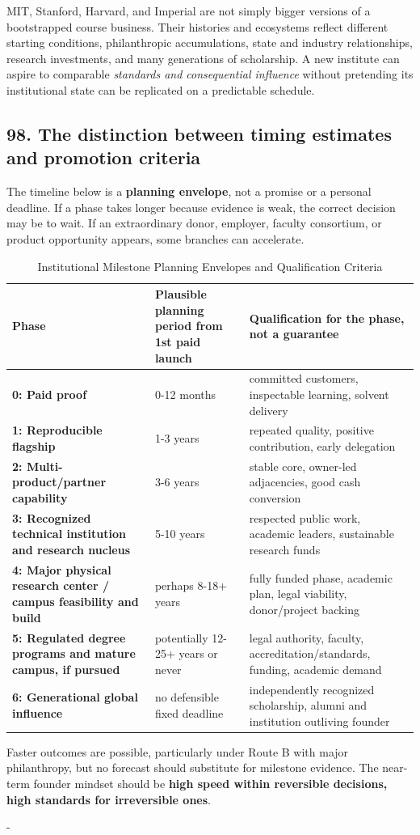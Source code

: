 MIT, Stanford, Harvard, and Imperial are not simply bigger versions of a bootstrapped course business. Their histories and ecosystems reflect different starting conditions, philanthropic accumulations, state and industry relationships, research investments, and many generations of scholarship. A new institute can aspire to comparable \textit{standards and consequential influence} without pretending its institutional state can be replicated on a predictable schedule.

\subsection{98. The distinction between timing estimates and promotion criteria}

The timeline below is a \textbf{planning envelope}, not a promise or a personal deadline. If a phase takes longer because evidence is weak, the correct decision may be to wait. If an extraordinary donor, employer, faculty consortium, or product opportunity appears, some branches can accelerate.

\begin{table}[t]
\centering
\small
\caption{Institutional Milestone Planning Envelopes and Qualification Criteria}
\label{tab:ch36_promotion_criteria}
\begin{tabularx}{\textwidth}{p{3.8cm} p{3.2cm} X}
\toprule
\textbf{ Phase } & \textbf{ Plausible planning period from 1st paid launch } & \textbf{ Qualification for the phase, not a guarantee } \\
\midrule
 \textbf{0: Paid proof}  &  0-12 months  &  committed customers, inspectable learning, solvent delivery  \\
 \textbf{1: Reproducible flagship}  &  1-3 years  &  repeated quality, positive contribution, early delegation  \\
 \textbf{2: Multi-product/\allowbreak partner capability}  &  3-6 years  &  stable core, owner-led adjacencies, good cash conversion  \\
 \textbf{3: Recognized technical institution and research nucleus}  &  5-10 years  &  respected public work, academic leaders, sustainable research funds  \\
 \textbf{4: Major physical research center / campus feasibility and build}  &  perhaps 8-18+ years  &  fully funded phase, academic plan, legal viability, donor/\allowbreak project backing  \\
 \textbf{5: Regulated degree programs and mature campus, if pursued}  &  potentially 12-25+ years or never  &  legal authority, faculty, accreditation/\allowbreak standards, funding, academic demand  \\
 \textbf{6: Generational global influence}  &  no defensible fixed deadline  &  independently recognized scholarship, alumni and institution outliving founder  \\
\bottomrule
\end{tabularx}
\end{table}

Faster outcomes are possible, particularly under Route B with major philanthropy, but no forecast should substitute for milestone evidence. The near-term founder mindset should be \textbf{high speed within reversible decisions, high standards for irreversible ones}.

-


